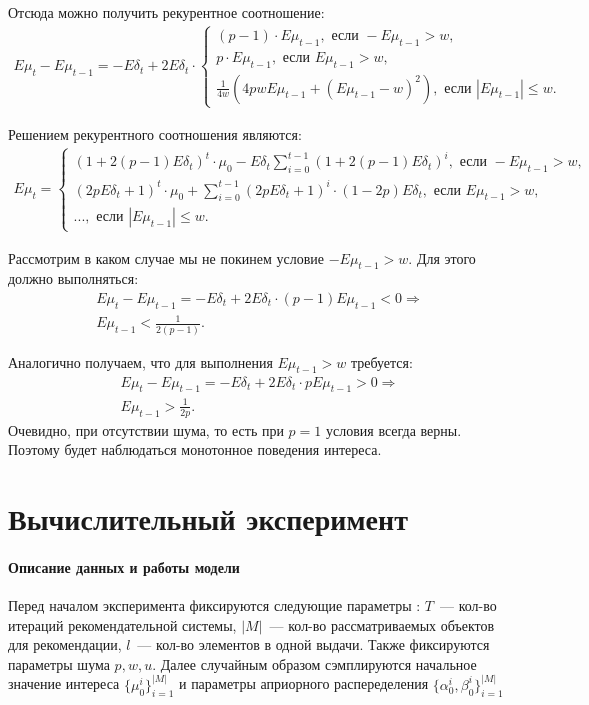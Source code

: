 \documentclass[12pt, twoside]{article}
\begin{document}
Отсюда можно получить рекурентное соотношение:
\begin{gather*}
  E \mu_{t} - E \mu_{t-1} =  - E\delta_t + 2 E\delta_t \cdot 
    \begin{cases} 
      (p-1) \cdot E\mu_{t-1}, \text{ если } -E\mu_{t-1} > w, \\
      p \cdot E\mu_{t-1}, \text{ если } E\mu_{t-1} > w, \\
      \frac{1}{4w} \left( 4 p w E\mu_{t-1} + (E \mu_{t-1} - w)^2 \right), \text{ если } |E\mu_{t-1}| \leq w.
    \end{cases} 
\end{gather*}

Решением рекурентного соотношения являются:
\begin{gather*}
  E \mu_{t} = 
    \begin{cases} 
      \left(1 + 2 (p-1) E\delta_t \right)^t \cdot \mu_0 - E\delta_t\sum_{i=0}^{t-1}(1 + 2 (p-1) E\delta_t)^i , \text{ если } -E\mu_{t-1} > w, \\
      \left( 2 p E\delta_t+ 1\right )^t \cdot \mu_0 + \sum_{i=0}^{t-1}(2 p E\delta_t+1)^i \cdot(1-2p)E\delta_t, \text{ если } E\mu_{t-1} > w, \\
      ..., \text{ если } |E\mu_{t-1}| \leq w.
    \end{cases} 
\end{gather*}

Рассмотрим в каком случае мы не покинем условие $-E \mu_{t-1} >w$. Для этого должно выполняться:
\begin{gather*}
  E \mu_{t} - E \mu_{t-1} = - E\delta_t + 2 E\delta_t \cdot (p-1) E\mu_{t-1} < 0 \Rightarrow  \\
  E\mu_{t-1} < \frac{1}{2(p-1)}.
\end{gather*}

Аналогично получаем, что для выполнения $E\mu_{t-1} > w$ требуется:
\begin{gather*}
  E \mu_{t} - E \mu_{t-1} = -E\delta_t + 2 E\delta_t \cdot p E\mu_{t-1} > 0 \Rightarrow  \\
  E\mu_{t-1} > \frac{1}{2p}.
\end{gather*}
Очевидно, при отсутствии шума, то есть при $p = 1$ условия всегда верны. 
Поэтому будет наблюдаться монотонное поведения интереса.

\section{Вычислительный эксперимент}
\paragraph{Описание данных и работы модели}
Перед началом эксперимента фиксируются следующие параметры : $T$~--- кол-во итераций рекомендательной системы, $|M|$~--- кол-во рассматриваемых объектов для рекомендации, $l$~--- кол-во элементов в одной выдачи. 
Также фиксируются параметры шума $p, w, u$.
Далее случайным образом сэмплируются начальное значение интереса $\{\mu_0^i\}_{i=1}^{|M|}$ и параметры априорного распеределения $\{\alpha_0^i, \beta_0^i\}_{i=1}^{|M|}$  
\end{document}
